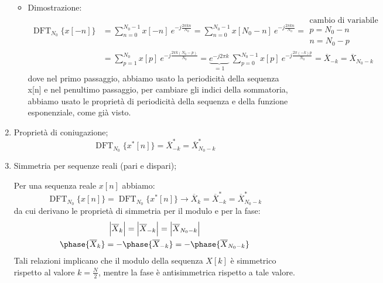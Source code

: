 \documentclass[
]{article}
\providecommand{\tightlist}{%
  \setlength{\itemsep}{0pt}\setlength{\parskip}{0pt}}
\begin{document}
\begin{enumerate}
  \begin{itemize}
  \tightlist
  \item
    Dimostrazione: \begin{align*}
    \operatorname{DFT}_{N_0}\Big\{ x[-n] \Big\} &= \sum_{n=0}^{N_0 -1} x[-n] \ e^{-j\frac{2\pi kn}{N_0}} = \sum_{n=0}^{N_0 -1} x[N_0 -n] \ e^{-j\frac{2\pi kn}{N_0}} =
    \boxed{
    \begin{array}{cl}
    \text{cambio di variabile} \\
    p  = N_0 - n \\
    n  = N_0 - p
    \end{array}}\\
    &= \sum_{p=1}^{N_0} x[p] \ e^{-j\frac{2\pi k(N_0 -p)}{N_0}} = \underbrace{e^{-j2\pi k}}_{=1} \ \sum_{p=0}^{N_0 -1} x[p] \ e^{-j\frac{2\pi(-k)p}{N_0}} = \overline{X}_{-k} = \overline{X}_{N_0 - k}
    \end{align*} dove nel primo passaggio, abbiamo usato la periodicità
    della sequenza x{[}n{]} e nel penultimo passaggio, per cambiare gli
    indici della sommatoria, abbiamo usato le proprietà di periodicità
    della sequenza e della funzione esponenziale, come già visto.
  \end{itemize}
\item
  Proprietà di coniugazione; \[
  \operatorname{DFT}_{N_0}\Big\{ x^{*}[n] \Big\} = \overline{X}^{*}_{-k} = \overline{X}^{*}_{N_0 - k}
  \]
\item
  Simmetria per sequenze reali (pari e dispari);

  Per una sequenza reale \(x[n]\) abbiamo: \[
  \operatorname{DFT}_{N_0}\Big\{ x[n] \Big\} = \operatorname{DFT}_{N_0}\Big\{x^{*}[n] \Big\} \to \overline{X}_k = \overline{X}^{*}_{-k} = \overline{X}^{*}_{N_0 -k}
  \] da cui derivano le proprietà di simmetria per il modulo e per la
  fase: \begin{gather*}
  \Big|\overline{X}_k \Big| = \Big|\overline{X}_{-k}\Big| = \Big| \overline{X}_{N_0 - k} \Big| \\
  \phase{\overline{X}_k} = -\phase{\overline{X}_{-k}} = -\phase{\overline{X}_{N_0 -k}}
  \end{gather*} Tali relazioni implicano che il modulo della sequenza
  \(X[k]\) è simmetrico rispetto al valore \(k = \frac{N}{2}\), mentre
  la fase è antisimmetrica rispetto a tale valore.


\end{enumerate}
\end{document}
